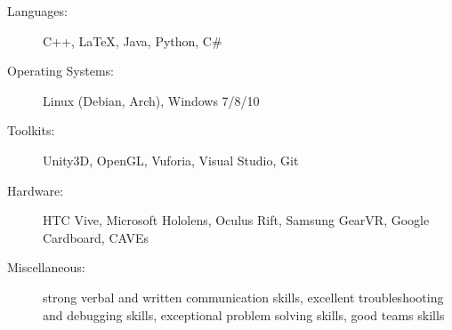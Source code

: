 
\begin{description}
	\item[Languages:]
		C++, \LaTeX, Java, Python, C\#
		
	\item[Operating Systems:]
		Linux (Debian, Arch), Windows 7/8/10
		
	\item[Toolkits:]
		Unity3D, OpenGL, Vuforia, Visual Studio, Git

	\item[Hardware:]
		HTC Vive, Microsoft Hololens, Oculus Rift, Samsung GearVR,
		Google Cardboard, CAVEs

	\item[Miscellaneous:]
		strong verbal and written communication skills, excellent 
		troubleshooting and debugging skills, exceptional problem 
		solving skills, good teams skills
\end{description}

